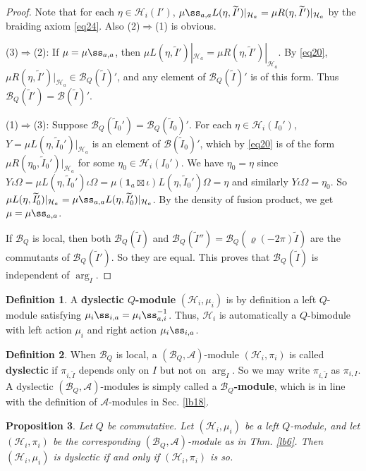 \documentclass[12pt,a4paper,notitlepage]{article}
\theoremstyle{definition}
\newtheorem{df}{Definition}[section]
\theoremstyle{plain}
\newtheorem{pp}[df]{Proposition}
\newcommand{\mc}{\mathcal}
\newcommand{\wtd}{\widetilde}
\newcommand{\id}{\mathbf{1}}
\numberwithin{equation}{section}
\begin{document}
\begin{proof}
Note that 	for each $\eta\in\mc H_i(I')$, $\mu\ss_{a,a}L(\eta,\wtd I')|_{\mc H_a}=\mu R(\eta,\wtd I')|_{\mc H_a}$ by the braiding axiom \eqref{eq24}. Also (2)$\Rightarrow$(1) is obvious. 

(3)$\Rightarrow$(2): If $\mu=\mu\ss_{a,a}$, then $\mu L(\eta,\wtd I')|_{\mc H_a}=\mu R(\eta,\wtd I')|_{\mc H_a}$.  By \eqref{eq20}, $\mu R(\eta,\wtd I')|_{\mc H_a}\in\mc B_Q(\wtd I)'$, and any element of $\mc B_Q(\wtd I)'$ is of this form. Thus $\mc B_Q(\wtd I')=\mc B(\wtd I)'$.

(1)$\Rightarrow$(3): Suppose $\mc B_Q(\wtd I_0')=\mc B_Q(\wtd I_0)'$. For each $\eta\in\mc H_i(I_0')$, $Y=\mu L(\eta,\wtd I_0')|_{\mc H_a}$	is an element of $\mc B(\wtd I_0)'$, which by \eqref{eq20} is of the form $\mu R(\eta_0,\wtd I_0')|_{\mc H_a}$ for some $\eta_0\in\mc H_i(I_0')$. We have $\eta_0=\eta$ since $Y\iota\Omega=\mu L(\eta,\wtd I_0')\iota\Omega=\mu(\id_a\boxtimes\iota)L(\eta,\wtd I_0')\Omega=\eta$ and similarly $Y\iota\Omega=\eta_0$. So $\mu L(\eta,\wtd I_0')|_{\mc H_a}=\mu\ss_{a,a}L(\eta,\wtd I_0')|_{\mc H_a}$. By the density of fusion product, we get $\mu=\mu\ss_{a,a}$.

If $\mc B_Q$ is local, then both $\mc B_Q(\wtd I)$ and $\mc B_Q(\wtd I'')=\mc B_Q(\varrho(-2\pi)\wtd I)$ are the commutants of $\mc B_Q(\wtd I')$. So they are equal. This proves that $\mc B_Q(\wtd I)$ is independent of $\arg_I$.
\end{proof}


\begin{df}
A \textbf{dyslectic $Q$-module} $(\mc H_i,\mu_i)$ is by definition a left $Q$-module satisfying $\mu_i\ss_{i,a}=\mu_i\ss_{a,i}^{-1}$. Thus, $\mc H_i$ is automatically a $Q$-bimodule with left action $\mu_i$ and right action $\mu_i\ss_{i,a}$.
\end{df}

\begin{df}
When $\mc B_Q$ is local, a $(\mc B_Q,\mc A)$-module $(\mc H_i,\pi_i)$ is called \textbf{dyslectic} if $\pi_{i,\wtd I}$ depends only on $I$ but not on $\arg_I$. So we may write $\pi_{i,\wtd I}$ as $\pi_{i,I}$. A dyslectic $(\mc B_Q,\mc A)$-modules is simply called a \textbf{$\mc B_Q$-module}, which is in line with the definition of $\mc A$-modules in Sec. \ref{lb18}.
\end{df}




\begin{pp}\label{lb22}
Let $Q$ be commutative. Let $(\mc H_i,\mu_i)$ be a left $Q$-module, and let $(\mc H_i,\pi_i)$ be the corresponding $(\mc B_Q,\mc A)$-module as in Thm. \ref{lb6}. Then $(\mc H_i,\mu_i)$ is dyslectic if and only if $(\mc H_i,\pi_i)$ is so.
\end{pp}
\end{document}
